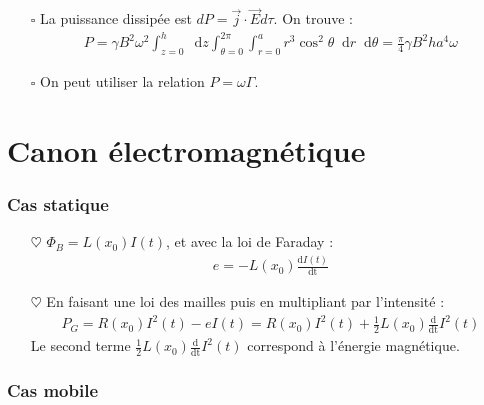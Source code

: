 \documentclass{report}
\newcommand*\dif{\mathop{}\!\mathrm{d}}
\begin{document}
\begin{itemize}
		\item[$\square$] La puissance dissipée est $dP=\vec{j}\cdot\vec{E}d\tau$.
		On trouve :
		\begin{align*}
		P=\gamma B^2\omega^2\int_{z=0}^h \dif z\int_{\theta=0}^{2\pi}\int_{r=0}^{a}r^3\cos^2\theta\dif r\dif\theta=\frac{\pi}{4}\gamma B^2ha^4\omega
		\end{align*}
		
		\item[$\square$] On peut utiliser la relation $P=\omega\Gamma$.
		
\end{itemize}

\section*{Canon électromagnétique}

\subsubsection*{Cas statique}

\begin{itemize}

	\item[$\heartsuit$] $\Phi_B=L(x_0)I(t)$, et avec la loi de Faraday :
	\begin{align*}
		e=-L(x_0)\frac{\mathrm{d}I(t)}{\mathrm{dt}}
	\end{align*}
	
	\item[$\heartsuit$] En faisant une loi des mailles puis en multipliant par l'intensité :
	\begin{align*}
		P_G=R(x_0)I^2(t)-eI(t)=R(x_0)I^2(t)+\frac{1}{2}L(x_0)\frac{\mathrm{d}} {\mathrm{dt}}I^2(t)
	\end{align*}
	Le second terme $\frac{1}{2}L(x_0)\frac{\mathrm{d}} {\mathrm{dt}}I^2(t)$ correspond à l'énergie magnétique.

\end{itemize}

\subsubsection*{Cas mobile}
\end{document}
